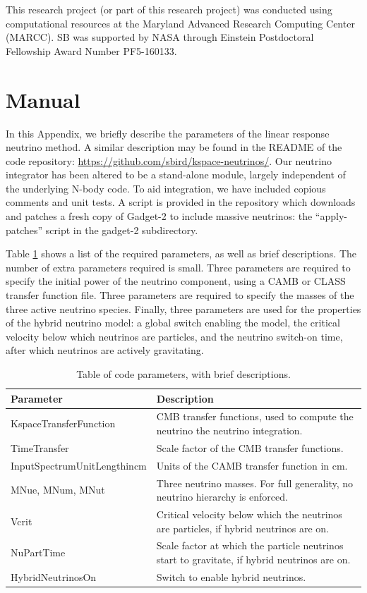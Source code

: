 \documentclass[useAMS, usenatbib]{mnras}
\begin{document}
This research project (or part of this research project) was conducted using computational resources 
at the Maryland Advanced Research Computing Center (MARCC). SB was supported by NASA through 
Einstein Postdoctoral Fellowship Award Number PF5-160133.

\appendix

\section{Manual}
\label{sec:manual}

In this Appendix, we briefly describe the parameters of the linear response neutrino method. A similar description may be found in the README of the code repository: \url{https://github.com/sbird/kspace-neutrinos/}. Our neutrino integrator has been altered to be a stand-alone module, largely independent of the underlying N-body code. To aid integration, we have included copious comments and unit tests. A script is provided in the repository which downloads and patches a fresh copy of Gadget-2 to include massive neutrinos: the ``apply-patches'' script in the gadget-2 subdirectory.

Table \ref{tab:parameters} shows a list of the required parameters, as well as brief descriptions. The number of extra parameters required is small. Three parameters are required to specify the initial power of the neutrino component, using a CAMB or CLASS transfer function file. Three parameters are required to specify the masses of the three active neutrino species. Finally, three parameters are used for the properties of the hybrid neutrino model: a global switch enabling the model, the critical velocity below which neutrinos are particles, and the neutrino switch-on time, after which neutrinos are actively gravitating.

\begin{table}
\begin{center}
\begin{tabular}{|l|l|}
\hline
    Parameter & Description \\
\hline
KspaceTransferFunction   & CMB transfer functions, used to compute the neutrino the neutrino integration. \\
TimeTransfer             & Scale factor of the CMB transfer functions. \\
InputSpectrumUnitLengthincm   & Units of the CAMB transfer function in cm. \\
MNue, MNum, MNut &  Three neutrino masses. For full generality, no neutrino  hierarchy is enforced. \\
Vcrit            & Critical velocity below which the neutrinos are particles, if hybrid neutrinos are on. \\
NuPartTime       & Scale factor at which the particle neutrinos start to gravitate, if hybrid neutrinos are on. \\
HybridNeutrinosOn       & Switch to enable hybrid neutrinos. \\
\hline
\end{tabular}
\end{center}
\caption{Table of code parameters, with brief descriptions.}
\label{tab:parameters}
\end{table}
\end{document}
